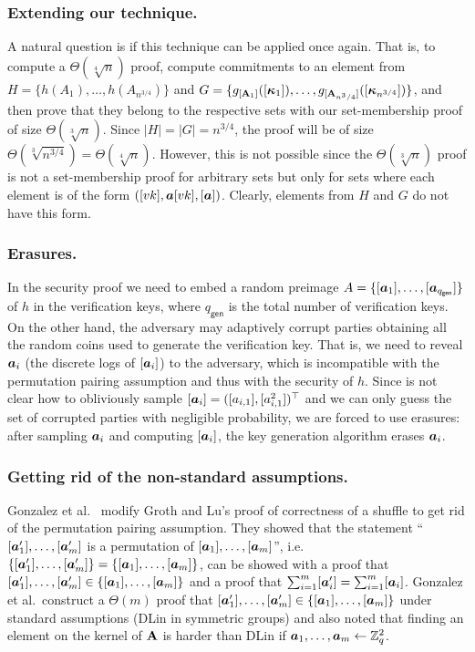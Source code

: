 \subsubsection{Extending our technique.}
A natural question is if this technique can be applied once again. That is, to compute a $\Theta(\sqrt[4]{n})$  proof, compute commitments to an element from $H=\{h(A_1),\ldots,h(A_{n^{3/4}})\}$ and
$G=\allowbreak\{
	g_{[\mathbf{{A}}_1]}
		([
			{\boldsymbol{\kappa}}_1]),
	\ldots,\allowbreak
	g_{[\mathbf{{A}}_{n^3/4}]}
		([
			{\boldsymbol{\kappa}}_{n^{3/4}}
])\}$,
and then prove that they belong to the respective sets with our set-membership proof of size $\Theta(\sqrt[3]{n})$. Since $|H|=|G|=n^{3/4}$, the proof will be of size $\Theta(\sqrt[3]{n^{3/4}})=\Theta(\sqrt[4]{n})$. However, this is not possible since the $\Theta(\sqrt[3]{n})$ proof is not a set-membership proof for arbitrary sets but only for sets where each element is of the form $([vk],{\boldsymbol{a}}[vk],[{\boldsymbol{a}}])$. Clearly, elements from $H$ and $G$ do not have this form.


\subsubsection{Erasures.}
In the security proof we need to embed a random preimage $A=\{[{\boldsymbol{a}}_1],\ldots,\allowbreak [{\boldsymbol{a}}_{q_{\mathsf{gen}}}]\}$ of $h$ in the verification keys, where $q_{\mathsf{gen}}$ is the total number of verification keys. On the other hand, the adversary may adaptively corrupt parties obtaining all the random coins used to generate the verification key. That is, we need to reveal ${\boldsymbol{a}}_i$ (the discrete logs of $[{\boldsymbol{a}}_i]$) to the adversary, which is incompatible with the permutation pairing assumption and thus with the security of $h$. Since is not clear how to obliviously sample $[{\boldsymbol{a}}_i]=([a_{i,1}],[a_{i,1}^2])^\top$ and we can only guess the set of corrupted parties with negligible probability, we are forced to use erasures: after sampling ${\boldsymbol{a}}_i$ and computing $[{\boldsymbol{a}}_i]$, the key generation algorithm erases ${\boldsymbol{a}}_i$.

\subsubsection{Getting rid of the non-standard assumptions.} Gonzalez et al.~\cite{ACNS:GonRaf16} modify Groth and Lu's proof of correctness of a shuffle \cite{AC:GroLu07} to get rid of the permutation pairing assumption. They showed that the statement ``$[{\boldsymbol{a}}'_1],\ldots,[{\boldsymbol{a}}'_m]$ is a permutation of $[{\boldsymbol{a}}_1],\ldots,[{\boldsymbol{a}}_m]$'', i.e.~$\{[{\boldsymbol{a}}'_1],\ldots,[{\boldsymbol{a}}'_m]\}=\{[{\boldsymbol{a}}_1],\ldots,[{\boldsymbol{a}}_m]\}$, can be showed with a proof that $[{\boldsymbol{a}}'_1],\ldots,[{\boldsymbol{a}}'_m]\in\{[{\boldsymbol{a}}_1],\ldots,[{\boldsymbol{a}}_m]\}$ and a proof that $\sum_{i=1}^m [{\boldsymbol{a}}'_i]=\sum_{i=1}^m [{\boldsymbol{a}}_i]$.  Gonzalez et al.~construct a $\Theta(m)$ proof that $[{\boldsymbol{a}}'_1],\ldots,[{\boldsymbol{a}}'_m]\in\{[{\boldsymbol{a}}_1],\ldots\allowbreak,[{\boldsymbol{a}}_m]\}$ under standard assumptions (DLin in symmetric groups)  and also noted that finding an element on the kernel of $\mathbf{{A}}$ is harder than DLin if ${\boldsymbol{a}}_1,\ldots,{\boldsymbol{a}}_m\gets\mathbb{Z}_q^2$.

